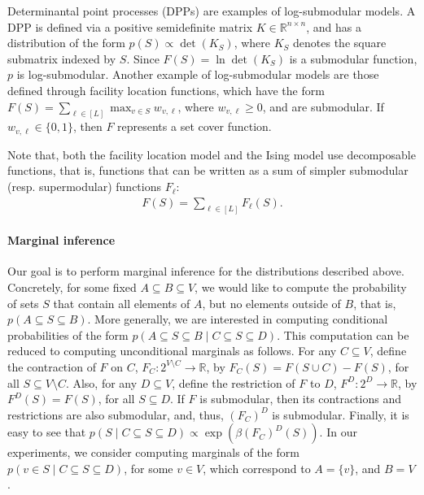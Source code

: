 Determinantal point processes (DPPs) are examples of log-submodular models.
A DPP is defined via a positive semidefinite matrix $K \in \mathbb{R}^{n \times n}$, and has a distribution of the form $p(S) \propto \det(K_S)$, where $K_S$ denotes the square submatrix indexed by $S$.
Since $F(S) = \ln \det(K_S)$ is a submodular function, $p$ is log-submodular.
Another example of log-submodular models are those defined through facility location functions, which have the form $F(S) = \sum_{\ell \in [L]} \max_{v \in S}w_{v,\ell}$, where $w_{v,\ell} \geq 0$, and are submodular.
If $w_{v,\ell} \in \{0, 1\}$, then $F$ represents a set cover function.

Note that, both the facility location model and the Ising model use decomposable functions, that is, functions that can be written as a sum of simpler submodular (resp. supermodular) functions $F_{\ell}$:
\begin{align} \label{eq:fdec}
F(S) = \sum_{\ell \in [L]} F_{\ell}(S).
\end{align}

\paragraph{Marginal inference}
Our goal is to perform marginal inference for the distributions described above.
Concretely, for some fixed $A \subseteq B \subseteq V$, we would like to compute the probability of sets $S$ that contain all elements of $A$, but no elements outside of $B$, that is, $p(A \subseteq S \subseteq B)$.
More generally, we are interested in computing conditional probabilities of the form $p(A \subseteq S \subseteq B \mid C \subseteq S \subseteq D)$.
This computation can be reduced to computing unconditional marginals as follows.
For any $C \subseteq V$, define the contraction of $F$ on $C$, $F_C : 2^{V \setminus C} \to \mathbb{R}$, by $F_C(S) = F(S \cup C) - F(S)$, for all $S \subseteq V \setminus C$.
Also, for any $D \subseteq V$, define the restriction of $F$ to $D$, $F^D : 2^D \to \mathbb{R}$, by $F^D(S) = F(S)$, for all $S \subseteq D$.
If $F$ is submodular, then its contractions and restrictions are also submodular, and, thus, $(F_C)^D$ is submodular.
Finally, it is easy to see that $p(S \mid C \subseteq S \subseteq D) \propto \exp(\beta (F_C)^D(S))$.
In our experiments, we consider computing marginals of the form $p(v \in S \mid C \subseteq S \subseteq D)$, for some $v \in V$, which correspond to $A = \{v\}$, and $B = V$.

